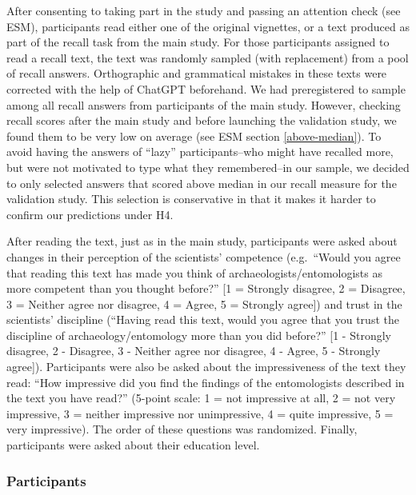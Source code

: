 \documentclass[
  doc,floatsintext]{apa6}
\begin{document}
After consenting to taking part in the study and passing an attention check (see ESM), participants read either one of the original vignettes, or a text produced as part of the recall task from the main study. For those participants assigned to read a recall text, the text was randomly sampled (with replacement) from a pool of recall answers. Orthographic and grammatical mistakes in these texts were corrected with the help of ChatGPT beforehand. We had preregistered to sample among all recall answers from participants of the main study. However, checking recall scores after the main study and before launching the validation study, we found them to be very low on average (see ESM section \ref{above-median}). To avoid having the answers of ``lazy'' participants--who might have recalled more, but were not motivated to type what they remembered--in our sample, we decided to only selected answers that scored above median in our recall measure for the validation study. This selection is conservative in that it makes it harder to confirm our predictions under H4.

After reading the text, just as in the main study, participants were asked about changes in their perception of the scientists' competence (e.g.~``Would you agree that reading this text has made you think of archaeologists/entomologists as more competent than you thought before?'' {[}1 = Strongly disagree, 2 = Disagree, 3 = Neither agree nor disagree, 4 = Agree, 5 = Strongly agree{]}) and trust in the scientists' discipline (``Having read this text, would you agree that you trust the discipline of archaeology/entomology more than you did before?'' {[}1 - Strongly disagree, 2 - Disagree, 3 - Neither agree nor disagree, 4 - Agree, 5 - Strongly agree{]}). Participants were also be asked about the impressiveness of the text they read: ``How impressive did you find the findings of the entomologists described in the text you have read?'' (5-point scale: 1 = not impressive at all, 2 = not very impressive, 3 = neither impressive nor unimpressive, 4 = quite impressive, 5 = very impressive). The order of these questions was randomized. Finally, participants were asked about their education level.

\subsubsection{Participants}\label{participants-1}
\end{document}
